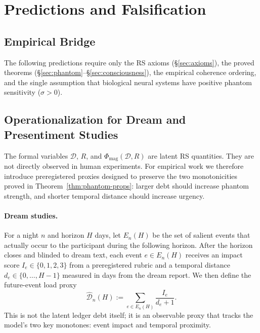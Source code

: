 \documentclass[11pt, a4paper]{article}
\theoremstyle{definition}
\theoremstyle{remark}
\begin{document}
\section{Predictions and Falsification}\label{sec:predictions}

\subsection{Empirical Bridge}

The following predictions require only the RS axioms
(\S\ref{sec:axioms}), the proved theorems
(\S\ref{sec:phantom}--\S\ref{sec:consciousness}), the empirical
coherence ordering, and the single assumption that biological
neural systems have positive phantom sensitivity ($\sigma > 0$).

\subsection{Operationalization for Dream and Presentiment Studies}
\label{sec:operational}

The formal variables $\mathcal{D}$, $R$, and
$\Phi_{\mathrm{mag}}(\mathcal{D},R)$ are latent RS quantities. They
are not directly observed in human experiments. For empirical work we
therefore introduce preregistered proxies designed to preserve the
two monotonicities proved in Theorem~\ref{thm:phantom-props}: larger
debt should increase phantom strength, and shorter temporal distance
should increase urgency.

\paragraph{Dream studies.}
For a night $n$ and horizon $H$ days, let $E_n(H)$ be the set of
salient events that actually occur to the participant during the
following horizon. After the horizon closes and blinded to dream text,
each event $e \in E_n(H)$ receives an impact score
$I_e \in \{0,1,2,3\}$ from a preregistered rubric and a temporal
distance $d_e \in \{0,\ldots,H-1\}$ measured in days from the dream
report. We then define the future-event load proxy
\begin{equation}\label{eq:debt-proxy-dream}
    \widehat{\mathcal{D}}_n(H)
    := \sum_{e \in E_n(H)} \frac{I_e}{d_e + 1}.
\end{equation}
This is not the latent ledger debt itself; it is an observable proxy
that tracks the model's two key monotones: event impact and temporal
proximity.
\end{document}
